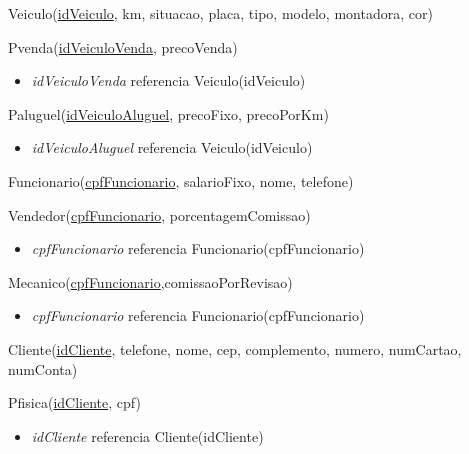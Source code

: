 \documentclass[brazil, a4paper,12pt]{article}
\begin{document}
Veiculo(\underline{idVeiculo}, km, situacao, placa, tipo, modelo, montadora, cor)

\vspace{1cm}

Pvenda(\underline{idVeiculoVenda}, precoVenda)
\begin{itemize}
\item \emph{idVeiculoVenda} referencia Veiculo(idVeiculo)
\end{itemize}

\vspace{1cm}

Paluguel(\underline{idVeiculoAluguel}, precoFixo, precoPorKm)
\begin{itemize}
\item \emph{idVeiculoAluguel} referencia Veiculo(idVeiculo)
\end{itemize}

\vspace{1cm}

Funcionario(\underline{cpfFuncionario}, salarioFixo, nome, telefone)

\vspace{1cm}

Vendedor(\underline{cpfFuncionario}, porcentagemComissao)
\begin{itemize}
\item \emph{cpfFuncionario} referencia Funcionario(cpfFuncionario)
\end{itemize}

\vspace{1cm}

Mecanico(\underline{cpfFuncionario},comissaoPorRevisao)
\begin{itemize}
\item \emph{cpfFuncionario} referencia Funcionario(cpfFuncionario)
\end{itemize}

\vspace{1cm}

Cliente(\underline{idCliente}, telefone, nome, cep, complemento, numero, numCartao, numConta)

\vspace{1cm}

Pfisica(\underline{idCliente}, cpf)
\begin{itemize}
\item \emph{idCliente} referencia Cliente(idCliente)
\end{itemize}

\vspace{1cm}
\end{document}
